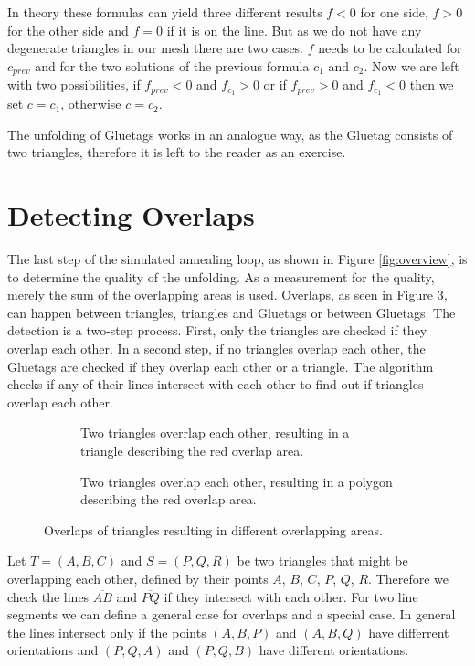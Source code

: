 \documentclass[draft,final]{vutinfth} %
\begin{document}
In theory these formulas can yield three different results $f < 0$ for one side, $f > 0$ for the other side and $f = 0$ if it is on the line. But as we do not have any degenerate triangles in our mesh there are two cases. $f$ needs to be calculated for $c_{prev}$ and for the two solutions of the previous formula $c_1$ and $c_2$. Now we are left with two possibilities, if $f_{prev} < 0$ and $f_{c_1} > 0$ or if $f_{prev} > 0$ and $f_{c_1} < 0$ then we set $c = c_1$, otherwise $c = c_2$.

The unfolding of Gluetags works in an analogue way, as the Gluetag consists of two triangles, therefore it is left to the reader as an exercise.

\section{Detecting Overlaps}

The last step of the simulated annealing loop, as shown in Figure \ref{fig:overview}, is to determine the quality of the unfolding. As a measurement for the quality, merely the sum of the overlapping areas is used. Overlaps, as seen in Figure \ref{fig:overlap}, can happen between triangles, triangles and Gluetags or between Gluetags. The detection is a two-step process. First, only the triangles are checked if they overlap each other. In a second step, if no triangles overlap each other, the Gluetags are checked if they overlap each other or a triangle. The algorithm checks if any of their lines intersect with each other to find out if triangles overlap each other.

\begin{figure}
\centering
\begin{subfigure}[t]{.5\textwidth}
	
  \caption{Two triangles overrlap each other, resulting in a triangle describing the red overlap area.}
	\label{fig:overlap1}
\end{subfigure}%
\begin{subfigure}[t]{.5\textwidth}
	
	\caption{Two triangles overlap each other, resulting in a polygon describing the red overlap area.}
	\label{fig:overlap2}
\end{subfigure}
\caption{Overlaps of triangles resulting in different overlapping areas.}
\label{fig:overlap}
\end{figure}

Let $T = (A,B,C)$ and $S = (P,Q,R)$ be two triangles that might be overlapping each other, defined by their points $A$, $B$, $C$, $P$, $Q$, $R$. Therefore we check the lines $\overline{AB}$ and $\overline{PQ}$ if they intersect with each other. For two line segments we can define a general case for overlaps and a special case. In general the lines intersect only if the points $(A,B,P)$ and $(A,B,Q)$ have differrent orientations and $(P,Q,A)$ and $(P,Q,B)$ have different orientations.
\end{document}
